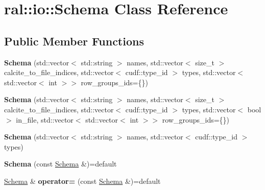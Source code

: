 \hypertarget{classral_1_1io_1_1Schema}{}\section{ral\+:\+:io\+:\+:Schema Class Reference}
\label{classral_1_1io_1_1Schema}
\subsection*{Public Member Functions}
\begin{DoxyCompactItemize}
\item 
\mbox{\label{classral_1_1io_1_1Schema_ad5677d1c413fdbb2b302d55158e8f9a9}} 
{\bfseries Schema} (std\+::vector$<$ std\+::string $>$ names, std\+::vector$<$ size\+\_\+t $>$ calcite\+\_\+to\+\_\+file\+\_\+indices, std\+::vector$<$ cudf\+::type\+\_\+id $>$ types, std\+::vector$<$ std\+::vector$<$ int $>$$>$ row\+\_\+groups\+\_\+ids=\{\})
\item 
\mbox{\label{classral_1_1io_1_1Schema_a72ab7081f47daa868987f0def1dc7324}} 
{\bfseries Schema} (std\+::vector$<$ std\+::string $>$ names, std\+::vector$<$ size\+\_\+t $>$ calcite\+\_\+to\+\_\+file\+\_\+indices, std\+::vector$<$ cudf\+::type\+\_\+id $>$ types, std\+::vector$<$ bool $>$ in\+\_\+file, std\+::vector$<$ std\+::vector$<$ int $>$$>$ row\+\_\+groups\+\_\+ids=\{\})
\item 
\mbox{\label{classral_1_1io_1_1Schema_a7127c5eaf8aff04d89e7cdea28ef3ce8}} 
{\bfseries Schema} (std\+::vector$<$ std\+::string $>$ names, std\+::vector$<$ cudf\+::type\+\_\+id $>$ types)
\item 
\mbox{\label{classral_1_1io_1_1Schema_a101d607e65e556dd91ebb9e86a133dc7}} 
{\bfseries Schema} (const \hyperlink{classral_1_1io_1_1Schema}{Schema} \&)=default
\item 
\mbox{\label{classral_1_1io_1_1Schema_ab07d34c02b98b34d80b4aa5fd18156a4}} 
\hyperlink{classral_1_1io_1_1Schema}{Schema} \& {\bfseries operator=} (const \hyperlink{classral_1_1io_1_1Schema}{Schema} \&)=default
\item 
\mbox{\label{classral_1_1io_1_1Schema_a1caf1be9e6f2661113fb65f79adf3804}} 

\end{DoxyCompactItemize}
